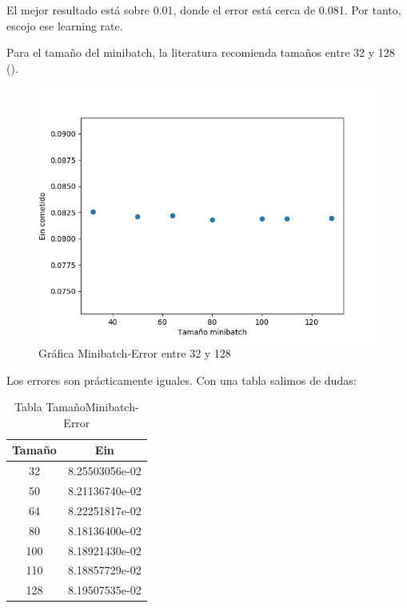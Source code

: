 El mejor resultado está sobre  0.01, donde el error está cerca de 0.081. Por tanto, escojo ese learning rate.

Para el tamaño del minibatch, la literatura recomienda tamaños entre 32 y 128 (\cite{lfd}).


\begin{figure}[H] %
	\centering
	\includegraphics[scale=0.6]{minibatch.png}  %
	\caption{Gráfica Minibatch-Error entre 32 y 128} 
	\label{fig:mb}
\end{figure}

Los errores son prácticamente iguales. Con una tabla salimos de dudas:

\begin{table}[H]
	\centering
	\begin{tabular}{|c|c|}
		\hline
		Tamaño & Ein            \\ \hline
		32     & 8.25503056e-02 \\ \hline
		50     & 8.21136740e-02 \\ \hline
		64     & 8.22251817e-02 \\ \hline
		80     & 8.18136400e-02 \\ \hline
		100    & 8.18921430e-02 \\ \hline
		110    & 8.18857729e-02 \\ \hline
		128    & 8.19507535e-02 \\ \hline
	\end{tabular}
	\caption{Tabla TamañoMinibatch-Error}
	\label{table2}
\end{table}


